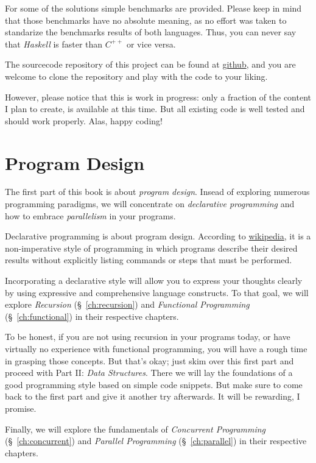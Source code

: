 \documentclass{scrbook}
\numberwithin{equation}{chapter}
\theoremstyle{definition}
\begin{document}
For some of the solutions simple benchmarks are provided.
Please keep in mind that those benchmarks have no absolute meaning, as no effort
was taken to standarize the benchmarks results of both languages.
Thus, you can never say that \emph{Haskell} is faster than $C^{++}$ or vice versa.

The sourcecode repository of this project can be found at
\href{https://github.com/okrischer/mastering}{github}, and you are welcome to clone
the repository and play with the code to your liking.

However, please notice that this is work in progress: only a fraction of the content
I plan to create, is available at this time. But all existing code is well tested and
should work properly. Alas, happy coding!

\mainmatter
\part{Program Design}
The first part of this book is about \emph{program design}.
Insead of exploring numerous programming paradigms, we will concentrate on
\emph{declarative programming} and how to embrace \emph{parallelism} in your programs.

Declarative programming is about program design. According to
\href{https://en.wikipedia.org/wiki/Declarative_programming}{wikipedia},
it is a non-imperative style of programming in which programs describe their desired
results without explicitly listing commands or steps that must be performed.

Incorporating a declarative style will allow you to express your thoughts clearly by using
expressive and comprehensive language constructs.
To that goal, we will explore \emph{Recursion} (§~\ref{ch:recursion}) and
\emph{Functional Programming} (§~\ref{ch:functional}) in their respective chapters.

To be honest, if you are not using recursion in your programs today, or have virtually no
experience with functional programming, you will have a rough time in grasping those concepts.
But that's okay; just skim over this first part and proceed with Part II: \emph{Data Structures}.
There we will lay the foundations of a good programming style based on simple code snippets.
But make sure to come back to the first part and give it another try afterwards.
It will be rewarding, I promise.

Finally, we will explore the fundamentals of \emph{Concurrent Programming}
(§~\ref{ch:concurrent}) and \emph{Parallel Programming} (§~\ref{ch:parallel})
in their respective chapters.
\end{document}
